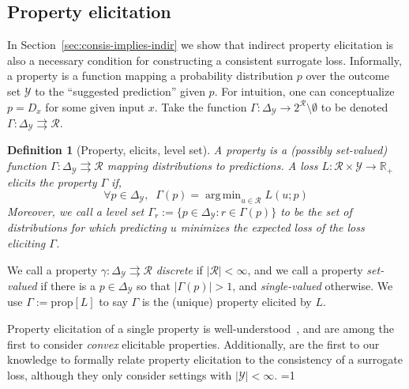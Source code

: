 \documentclass{article}
\newcommand{\Comments}{1}
\newcommand{\mytodo}[2]{\ifnum\Comments=1%
	\todo[linecolor=#1!80!black,backgroundcolor=#1,bordercolor=#1!80!black]{#2}\fi}
\newcommand{\jessiet}[1]{\mytodo{purple!20!white}{JF: #1}}
\newcommand{\reals}{\mathbb{R}}
\newcommand{\simplex}{\Delta_\Y}
\newcommand{\prop}[1]{\mathrm{prop}[#1]}
\newcommand{\R}{\mathcal{R}}
\newcommand{\Y}{\mathcal{Y}}
\newcommand{\toto}{\rightrightarrows}
\newtheorem{definition}{Definition}
\DeclareMathOperator*{\argmin}{arg\,min}
\begin{document}
\subsection{Property elicitation}\label{subsec:properties}
In Section~\ref{sec:consis-implies-indir} we show that indirect property elicitation is also a necessary condition for constructing a consistent surrogate loss.
Informally, a property is a function mapping a probability distribution $p$ over the outcome set $\Y$ to the ``suggested prediction'' given $p$.
For intuition, one can conceptualize $p = D_x$ for some given input $x$.
Take the function  $\Gamma: \simplex \to 2^\R \setminus \emptyset$ to be denoted $\Gamma:\simplex \toto \R$.
\begin{definition}[Property, elicits, level set]
	A \emph{property} is a (possibly set-valued) function $\Gamma : \simplex \toto \R$ mapping distributions to predictions.
	A loss $L : \R \times \Y \to \reals_+$ \emph{elicits} the property $\Gamma$ if,
	\begin{equation}
	\forall p \in \simplex, \;\; \Gamma(p) = \argmin_{u \in \R}L(u;p)
	\end{equation}
	Moreover, we call a \emph{level set} $\Gamma_r := \{p \in \simplex : r \in \Gamma(p)\}$ to be the set of distributions for which predicting $u$ minimizes the expected loss of the loss eliciting $\Gamma$.
\end{definition}

We call a property $\gamma: \simplex \toto \R$ \emph{discrete} if $|\R| < \infty$, and we call a property \emph{set-valued} if there is a $p \in \simplex$ so that $|\Gamma(p)| > 1$, and \emph{single-valued} otherwise.
We use $\Gamma := \prop{L}$ to say $\Gamma$ is the (unique) property elicited by $L$.

Property elicitation of a single property is well-understood~\citep{savage1971elicitation,osband1985information-eliciting,lambert2008eliciting, lambert2009eliciting, lambert2018elicitation}, and \citet{finocchiaro2018convex} are among the first to consider \emph{convex} elicitable properties.
Additionally, \citet{agarwal2015consistent} are the first to our knowledge to formally relate property elicitation to the consistency of a surrogate loss, although they only consider settings with $|\Y| < \infty$. \jessiet{right?}
\end{document}
